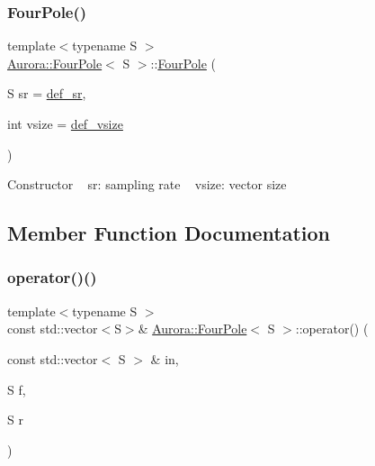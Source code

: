\subsubsection{\texorpdfstring{Four\+Pole()}{FourPole()}}
{\footnotesize\ttfamily template$<$typename S $>$ \\
\hyperlink{class_aurora_1_1_four_pole}{Aurora\+::\+Four\+Pole}$<$ S $>$\+::\hyperlink{class_aurora_1_1_four_pole}{Four\+Pole} (\begin{DoxyParamCaption}\item[{S}]{sr = {\ttfamily \hyperlink{namespace_aurora_ad49263d809bea98dd422e95bc91bc03e}{def\+\_\+sr}},  }\item[{int}]{vsize = {\ttfamily \hyperlink{namespace_aurora_afaaddf667a06e7ce23c667a8b7295263}{def\+\_\+vsize}} }\end{DoxyParamCaption})\hspace{0.3cm}{\ttfamily [inline]}}

Constructor ~\newline
sr\+: sampling rate ~\newline
vsize\+: vector size 

\subsection{Member Function Documentation}
\mbox{\label{class_aurora_1_1_four_pole_ac3cfee8b5d8f0bf8d0b0c6784eb81fef}} 
\subsubsection{\texorpdfstring{operator()()}{operator()()}\hspace{0.1cm}{\footnotesize\ttfamily [1/2]}}
{\footnotesize\ttfamily template$<$typename S $>$ \\
const std\+::vector$<$S$>$\& \hyperlink{class_aurora_1_1_four_pole}{Aurora\+::\+Four\+Pole}$<$ S $>$\+::operator() (\begin{DoxyParamCaption}\item[{const std\+::vector$<$ S $>$ \&}]{in,  }\item[{S}]{f,  }\item[{S}]{r }\end{DoxyParamCaption})\hspace{0.3cm}{\ttfamily [inline]}}

